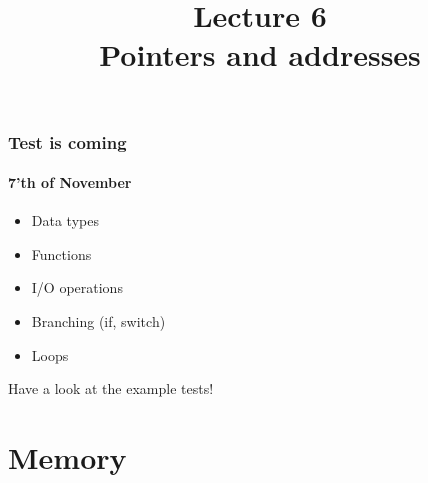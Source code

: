 \documentclass[10pt]{beamer}
\title{Lecture 6\\Pointers and addresses}
\date{}
\begin{document}
\frame{
    \titlepage
}

\begin{frame}
  \frametitle{Test is coming}
  \framesubtitle{7'th of November}
  \begin{itemize}
    \item Data types
    \item Functions
    \item I/O operations
    \item Branching (if, switch)
    \item Loops
  \end{itemize}
  
  Have a look at the example tests!
\end{frame}


\section{Memory}
\end{document}
